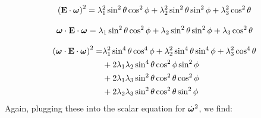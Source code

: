 \documentclass[extra,mreferee]{gji}
\begin{document}
\begin{equation}
\left(\mathbf{E}\cdot \mitbf{\omega}\right)^2 = \lambda_1^2 \sin^2{\theta} \cos^2{\phi} + \lambda_2^2 \sin^2{\theta} \sin^2{\phi} + \lambda_3^2 \cos^2{\theta}
\end{equation}

\begin{equation}
\mitbf{\omega} \cdot \mathbf{E} \cdot \mitbf{\omega} = 
\lambda_1 \sin^2{\theta} \cos^2{\phi} + \lambda_2 \sin^2{\theta} \sin^2{\phi} + \lambda_3 \cos^2{\theta}
\end{equation}

\begin{equation}
\begin{aligned}
\left(\mitbf{\omega} \cdot \mathbf{E} \cdot \mitbf{\omega} \right)^2 =  
&\lambda_1^2 \sin^4{\theta} \cos^4{\phi} + 
\lambda_2^2 \sin^4{\theta} \sin^4{\phi} +
\lambda_3^2 \cos^4{\theta} \\
&+ 2 \lambda_1 \lambda_2 \sin^4{\theta} \cos^2{\phi}\sin^2{\phi} \\ 
&+ 2 \lambda_1 \lambda_3 \sin^2{\theta} \cos^2{\theta} \cos^2{\phi} \\
&+ 2 \lambda_2 \lambda_3 \sin^2{\theta} \cos^2{\theta} \sin^2{\phi} \\ 
\end{aligned}
\end{equation}
Again, plugging these into the scalar equation for $\dot{\mitbf{\omega}}^2$, we find:
\end{document}
